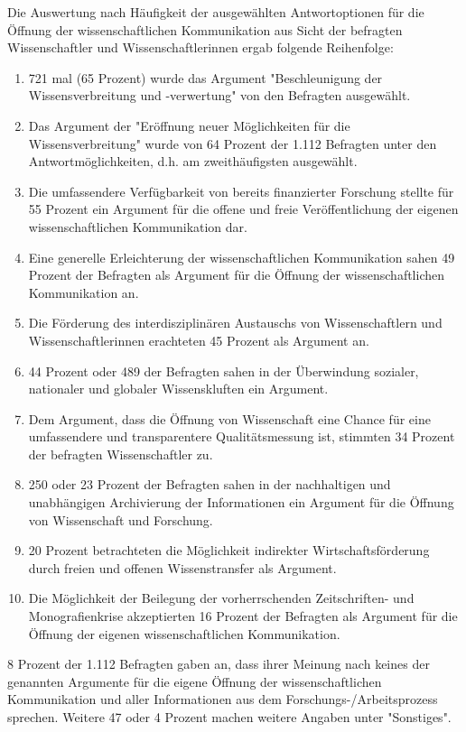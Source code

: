Die Auswertung nach Häufigkeit der ausgewählten Antwortoptionen für die Öffnung der wissenschaftlichen Kommunikation aus Sicht der befragten Wissenschaftler und Wissenschaftlerinnen ergab folgende Reihenfolge:
\begin{enumerate}
\item 721 mal (65 Prozent) wurde das Argument "Beschleunigung der Wissensverbreitung und -verwertung" von den Befragten ausgewählt.
\item Das Argument der "Eröffnung neuer Möglichkeiten für die Wissensverbreitung" wurde von 64 Prozent der 1.112 Befragten unter den Antwortmöglichkeiten, d.h. am zweithäufigsten ausgewählt.
\item Die umfassendere Verfügbarkeit von bereits finanzierter Forschung stellte für 55 Prozent ein Argument für die offene und freie Veröffentlichung der eigenen wissenschaftlichen Kommunikation dar.
\item Eine generelle Erleichterung der wissenschaftlichen Kommunikation sahen 49 Prozent der Befragten als Argument für die Öffnung der wissenschaftlichen Kommunikation an.
\item Die Förderung des interdisziplinären Austauschs von Wissenschaftlern und Wissenschaftlerinnen erachteten 45 Prozent als Argument an.
\item 44 Prozent oder 489 der Befragten sahen in der Überwindung sozialer, nationaler und globaler Wissenskluften ein Argument.
\item Dem Argument, dass die Öffnung von Wissenschaft eine Chance für eine umfassendere und transparentere Qualitätsmessung ist, stimmten 34 Prozent der befragten Wissenschaftler zu.
\item 250 oder 23 Prozent der Befragten sahen in der nachhaltigen und unabhängigen Archivierung der Informationen ein Argument für die Öffnung von Wissenschaft und Forschung.
\item 20 Prozent betrachteten die Möglichkeit indirekter Wirtschaftsförderung durch freien und offenen Wissenstransfer als Argument.
\item Die Möglichkeit der Beilegung der vorherrschenden Zeitschriften- und Monografienkrise akzeptierten 16 Prozent der Befragten als Argument für die Öffnung der eigenen wissenschaftlichen Kommunikation.
\end{enumerate}

8 Prozent der 1.112 Befragten gaben an, dass ihrer Meinung nach keines der genannten Argumente für die eigene Öffnung der wissenschaftlichen Kommunikation und aller Informationen aus dem Forschungs-/Arbeitsprozess sprechen. Weitere 47 oder 4 Prozent machen weitere Angaben unter "Sonstiges".

